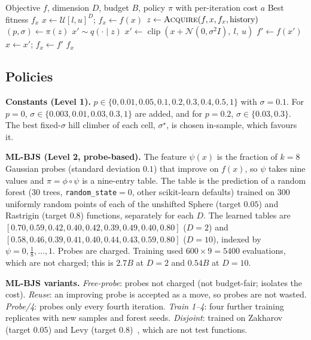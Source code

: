 \documentclass[conference]{IEEEtran}
\begin{document}
\begin{algorithm}[t]
\caption{BJS Engine with Policy $\pi$ and Strict Budget}
\label{alg:search}
\begin{algorithmic}[1]
\REQUIRE Objective $f$, dimension $D$, budget $B$, policy $\pi$ with per-iteration cost $a$
\ENSURE Best fitness $f_x$
\STATE $x \leftarrow \mathcal{U}[l,u]^D$; $f_x \leftarrow f(x)$
  \STATE $z \leftarrow \textsc{Acquire}(f,x,f_x,\text{history})$ 
  \STATE $(p,\sigma) \leftarrow \pi(z)$
    \STATE $x' \sim q(\cdot\mid z)$ 
  \ELSE
    \STATE $x' \leftarrow \operatorname{clip}\!\left(x + \mathcal{N}(0,\sigma^2 I),\ l,\ u\right)$
  \ENDIF
  \STATE $f' \leftarrow f(x')$
    \STATE $x \leftarrow x'$; $f_x \leftarrow f'$
  \ENDIF
\ENDWHILE
\RETURN $f_x$
\end{algorithmic}
\end{algorithm}

\subsection{Policies}
\textbf{Constants (Level 1).} $p\in\{0,0.01,0.05,0.1,0.2,0.3,0.4,0.5,1\}$ with $\sigma=0.1$. For $p=0$, $\sigma\in\{0.003,0.01,0.03,0.3,1\}$ are added, and for $p=0.2$, $\sigma\in\{0.03,0.3\}$. The best fixed-$\sigma$ hill climber of each cell, $\sigma^\star$, is chosen in-sample, which favours it.

\textbf{ML-BJS (Level 2, probe-based).} The feature $\psi(x)$ is the fraction of $k=8$ Gaussian probes (standard deviation $0.1$) that improve on $f(x)$, so $\psi$ takes nine values and $\pi=\phi\circ\psi$ is a nine-entry table. The table is the prediction of a random forest (30 trees, \texttt{random\_state}$=0$, other scikit-learn defaults) trained on 300 uniformly random points of each of the unshifted Sphere (target $0.05$) and Rastrigin (target $0.8$) functions, separately for each $D$. The learned tables are $[0.70,0.59,0.42,0.40,0.42,0.39,0.49,0.40,0.80]$ ($D=2$) and $[0.58,0.46,0.39,0.41,0.40,0.44,0.43,0.59,0.80]$ ($D=10$), indexed by $\psi=0,\frac18,\dots,1$. Probes are charged. Training used $600\times9=5400$ evaluations, which are not charged; this is $2.7B$ at $D=2$ and $0.54B$ at $D=10$.

\textbf{ML-BJS variants.} \emph{Free-probe}: probes not charged (not budget-fair; isolates the cost). \emph{Reuse}: an improving probe is accepted as a move, so probes are not wasted. \emph{Probe/4}: probes only every fourth iteration. \emph{Train 1--4}: four further training replicates with new samples and forest seeds. \emph{Disjoint}: trained on Zakharov (target $0.05$) and Levy (target $0.8$)~\cite{jamil2013}, which are not test functions.
\end{document}
